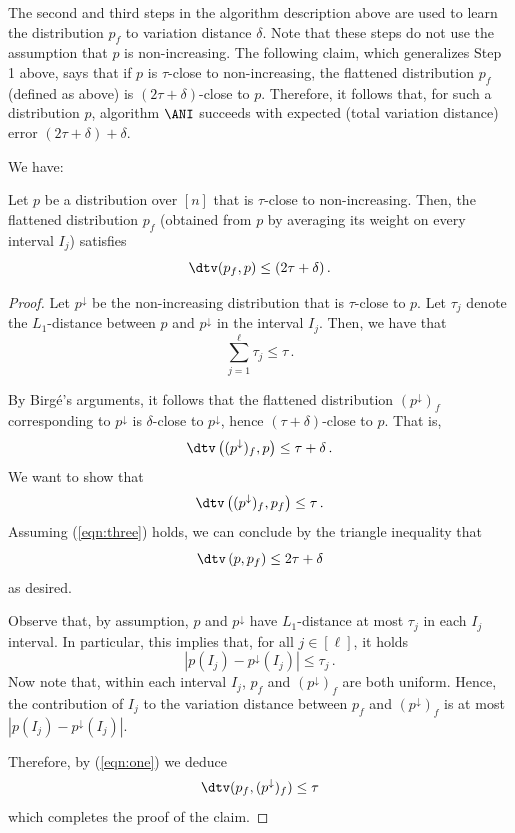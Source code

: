 The second and third steps in the algorithm description
above are used to learn the distribution $p_f$ to variation distance $\delta$.
Note that these steps do not use the assumption that $p$ is non-increasing.
The following claim, which generalizes Step 1 above, says that if $p$ is $\tau$-close to non-increasing,
the flattened distribution $p_f$ (defined as above) is $(2\tau+\delta)$-close to $p$.
Therefore, it follows that, for such a distribution $p$,
algorithm $\ANI$ succeeds with expected (total variation distance) error
$(2\tau+\delta)+\delta$.

\noindent We have:

\begin{claim}
Let $p$ be a distribution over $[n]$ that is $\tau$-close to non-increasing.
Then, the flattened distribution $p_f$ (obtained from $p$ by averaging its
weight on every interval $I_j$) satisfies
\[
\dtv(p_f,p) \leq (2\tau+\delta)\,.
\]
\end{claim}

\begin{proof}
Let $p^{\downarrow}$ be the non-increasing distribution that is $\tau$-close to $p$.
Let $\tau_j$ denote the $L_1$-distance between $p$ and $p^{\downarrow}$ in the interval $I_j$.
Then, we have that
\begin{equation} \label{eqn:one}
\sum_{j=1}^{\ell} \tau_j \leq \tau\,.
\end{equation}

By Birg{\'e}'s arguments, it follows that the flattened distribution $(p^{\downarrow})_f$
corresponding to $p^{\downarrow}$ is $\delta$-close to $p^{\downarrow}$,
hence $(\tau+\delta)$-close to $p$. That is,
\begin{equation} \label{eqn:two}
\dtv \left( (p^{\downarrow})_f, p \right)  \leq \tau+\delta\,.
\end{equation}
We want to show that
\begin{equation} \label{eqn:three}
\dtv \left( (p^{\downarrow})_f, p_f \right) \leq \tau\,.
\end{equation}
Assuming (\ref{eqn:three}) holds, we can conclude by the triangle inequality that
$$\dtv \left(p, p_f \right) \leq 2\tau+\delta$$
as desired.

Observe that, by assumption, $p$ and $p^{\downarrow}$ have
$L_1$-distance at most $\tau_j$ in each $I_j$ interval.
In particular, this implies that, for all $j \in [\ell]$, it holds
$$ \left| p(I_j) - p^{\downarrow}(I_j) \right| \leq \tau_j\,.$$
Now note that, within each interval $I_j$, $p_f$ and $(p^{\downarrow})_f$ are both uniform.
Hence, the contribution of $I_j$ to the variation distance between  $p_f$ and $(p^{\downarrow})_f$
is at most $|p(I_j) - p^{\downarrow}(I_j)|$.

Therefore, by (\ref{eqn:one}) we deduce
$$\dtv (p_f , (p^{\downarrow})_f ) \leq \tau$$
which completes the proof of the claim.
\end{proof}

